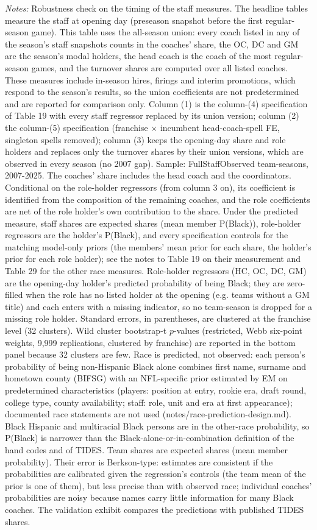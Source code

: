 {\footnotesize
\noindent\textit{Notes:} Robustness check on the timing of the staff measures. The headline tables measure the staff at opening day (preseason snapshot before the first regular-season game). This table uses the all-season union: every coach listed in any of the season's staff snapshots counts in the coaches' share, the OC, DC and GM are the season's modal holders, the head coach is the coach of the most regular-season games, and the turnover shares are computed over all listed coaches. These measures include in-season hires, firings and interim promotions, which respond to the season's results, so the union coefficients are not predetermined and are reported for comparison only. Column (1) is the column-(4) specification of Table 19 with every staff regressor replaced by its union version; column (2) the column-(5) specification (franchise $\times$ incumbent head-coach-spell FE, singleton spells removed); column (3) keeps the opening-day share and role holders and replaces only the turnover shares by their union versions, which are observed in every season (no 2007 gap). Sample: FullStaffObserved team-seasons, 2007-2025. The coaches' share includes the head coach and the coordinators. Conditional on the role-holder regressors (from column 3 on), its coefficient is identified from the composition of the remaining coaches, and the role coefficients are net of the role holder's own contribution to the share. Under the predicted measure, staff shares are expected shares (mean member P(Black)), role-holder regressors are the holder's P(Black), and every specification controls for the matching model-only priors (the members' mean prior for each share, the holder's prior for each role holder); see the notes to Table 19 on their measurement and Table 29 for the other race measures. Role-holder regressors (HC, OC, DC, GM) are the opening-day holder's predicted probability of being Black; they are zero-filled when the role has no listed holder at the opening (e.g. teams without a GM title) and each enters with a missing indicator, so no team-season is dropped for a missing role holder. Standard errors, in parentheses, are clustered at the franchise level (32 clusters). Wild cluster bootstrap-t $p$-values (restricted, Webb six-point weights, 9,999 replications, clustered by franchise) are reported in the bottom panel because 32 clusters are few. Race is predicted, not observed: each person's probability of being non-Hispanic Black alone combines first name, surname and hometown county (BIFSG) with an NFL-specific prior estimated by EM on predetermined characteristics (players: position at entry, rookie era, draft round, college type, county availability; staff: role, unit and era at first appearance); documented race statements are not used (notes/race-prediction-design.md). Black Hispanic and multiracial Black persons are in the other-race probability, so P(Black) is narrower than the Black-alone-or-in-combination definition of the hand codes and of TIDES. Team shares are expected shares (mean member probability). Their error is Berkson-type: estimates are consistent if the probabilities are calibrated given the regression's controls (the team mean of the prior is one of them), but less precise than with observed race; individual coaches' probabilities are noisy because names carry little information for many Black coaches. The validation exhibit compares the predictions with published TIDES shares.
\par}

